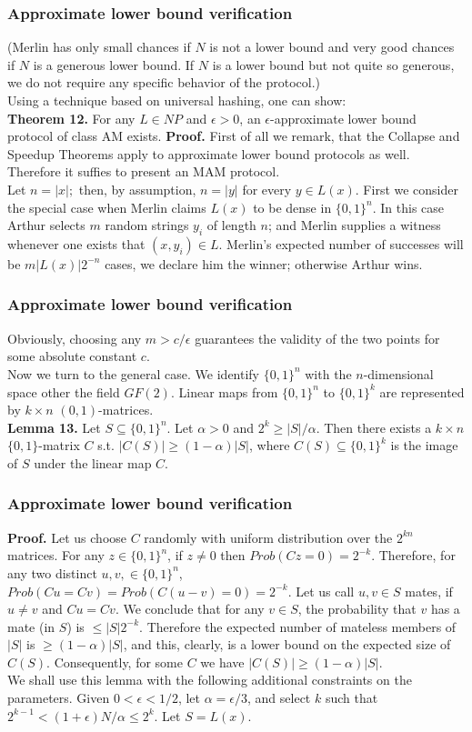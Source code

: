 \documentclass{beamer}
\begin{document}
\begin{frame}
\frametitle{Approximate lower bound verification}
(Merlin has only small chances if $N$ is not a lower bound and very good chances if $N$ is a generous lower bound. If $N$ is a lower bound but not quite so generous, we do not require any specific behavior of the protocol.)\\
Using a technique based on universal hashing, one can show:\\
\textbf{Theorem 12.} For any $L \in NP$ and $\epsilon > 0$, an $\epsilon$-approximate lower bound protocol of class AM exists.
\textbf{Proof.} First of all we remark, that the Collapse and Speedup Theorems apply to approximate lower bound protocols as well. Therefore it suffies to present an MAM protocol.\\
Let $n = |x|;$ then, by assumption, $n = |y|$ for every $y \in L(x)$. First we consider the special case when Merlin claims $L(x)$ to be dense in $\{0, 1\}^n$. In this case Arthur selects $m$ random strings $y_i$ of length $n$; and Merlin supplies a witness whenever one exists that $(x, y_i) \in L$. Merlin's expected number of successes will be $m|L(x)|2^{-n}$ cases, we declare him the winner; otherwise Arthur wins.
\end{frame}

\begin{frame}
\frametitle{Approximate lower bound verification}
Obviously, choosing any $m > c/\epsilon$ guarantees the validity of the two points for some absolute constant $c$.\\
Now we turn to the general case. We identify $\{0, 1\}^n$ with the $n$-dimensional space other the field $GF(2)$. Linear maps from $\{0, 1\}^n$ to $\{0, 1\}^k$ are represented by $k \times n$ $(0, 1)$-matrices.\\
\textbf{Lemma 13.} Let $S \subseteq \{0,1\}^n$. Let $\alpha > 0$ and $2^k \geq |S|/\alpha$. Then there exists a $k \times n$ $\{0, 1\}$-matrix $C$ s.t. $|C(S)|\geq (1- \alpha)|S|$, where $C(S) \subseteq \{0, 1\}^k$ is the image of $S$ under the linear map $C$.
\end{frame}

\begin{frame}
\frametitle{Approximate lower bound verification}
\textbf{Proof.} Let us choose $C$ randomly with uniform distribution over the $2^{kn}$ matrices. For any $z \in \{0, 1\}^n$, if $z \neq 0$ then $Prob(Cz = 0) = 2^{-k}$. Therefore, for any two distinct $u, v, \in \{0 ,1\}^n$, $Prob(Cu = Cv) = Prob(C(u-v)=0)=2^{-k}$. Let us call $u, v \in S$ mates, if $u \neq v$ and $Cu = Cv$. We conclude that for any $v \in S$, the probability that $v$ has a mate (in $S$) is $\leq |S|2^{-k}$. Therefore the expected number of mateless members of $|S|$ is $\geq (1 - \alpha)|S|$, and this, clearly, is a lower bound on the expected size of $C(S)$. Consequently, for some $C$ we have $|C(S)| \geq (1 - \alpha)|S|$.\\
We shall use this lemma with the following additional constraints on the parameters. Given $0 < \epsilon < 1/2$, let $\alpha = \epsilon/3$, and select $k$ such that $2^{k-1} < (1+\epsilon)N/\alpha \leq 2^k$. Let $S = L(x)$.
\end{frame}
\end{document}
